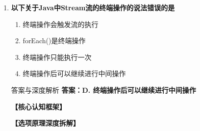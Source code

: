 \documentclass[12pt, a4paper]{ctexart}
\begin{document}
\begin{enumerate}[label=\textbf{\arabic*.}]
\begin{bluebox}{答案与深度解析}
\begin{itemize}[label={}, leftmargin=*, nosep]
\begin{itemize}[label={}, nosep]
			      \item Collection接口的默认方法
			      \item collection.stream()
		      

					  \end{itemize}
		      \item \textbf{B/C/D — 错误}
					  \begin{itemize}[label={}, nosep]
		      
			      \item 这些方法不存在
		      
		      

		      
					  \end{itemize}
					  \end{itemize}
\textbf{【应背诵知识点】}

		      创建Stream：
		      \begin{itemize}[label={}, nosep]
			      \item 集合：collection.stream() / collection.parallelStream()
			      \item 数组：Arrays.stream(array)
			      \item 静态方法：Stream.of()、Stream.iterate()、Stream.generate()
			      \item 文件：Files.lines()
		      \end{itemize}
	      \end{bluebox}

	      \vspace{1em}

	\item \textbf{以下关于Java中Stream流的终端操作的说法错误的是}
	      \begin{enumerate}[label=\Alph*.]
		      \item 终端操作会触发流的执行
		      \item forEach()是终端操作
		      \item 终端操作只能执行一次
		      \item 终端操作后可以继续进行中间操作
	      \end{enumerate}

	      \begin{bluebox}{答案与深度解析}
		      \textbf{答案：D. 终端操作后可以继续进行中间操作}

		      \textbf{【核心认知框架】}

		      \textbf{【选项原理深度拆解】}
					  \begin{itemize}[label={}, leftmargin=*, nosep]


\end{itemize}
\end{bluebox}
\end{enumerate}
\end{document}
